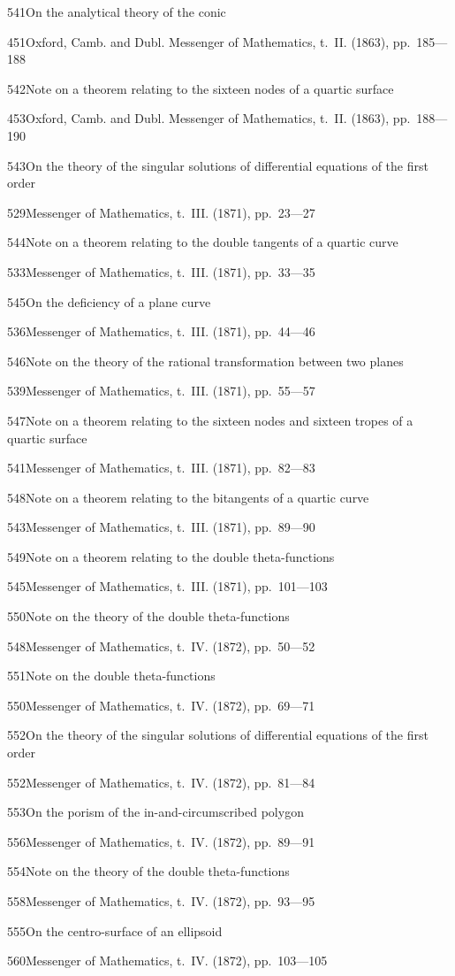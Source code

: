 \documentclass[11pt,a4paper]{book}
\providecommand{\tocentry}[2]{#1\dotfill #2\par}
\begin{document}
\tocentry{541}{On the analytical theory of the conic}{451}{Oxford, Camb. and Dubl. Messenger of Mathematics, t.~II. (1863), pp.~185---188}

\tocentry{542}{Note on a theorem relating to the sixteen nodes of a quartic surface}{453}{Oxford, Camb. and Dubl. Messenger of Mathematics, t.~II. (1863), pp.~188---190}

\newpage

\tocentry{543}{On the theory of the singular solutions of differential equations of the first order}{529}{Messenger of Mathematics, t.~III. (1871), pp.~23---27}

\tocentry{544}{Note on a theorem relating to the double tangents of a quartic curve}{533}{Messenger of Mathematics, t.~III. (1871), pp.~33---35}

\tocentry{545}{On the deficiency of a plane curve}{536}{Messenger of Mathematics, t.~III. (1871), pp.~44---46}

\tocentry{546}{Note on the theory of the rational transformation between two planes}{539}{Messenger of Mathematics, t.~III. (1871), pp.~55---57}

\tocentry{547}{Note on a theorem relating to the sixteen nodes and sixteen tropes of a quartic surface}{541}{Messenger of Mathematics, t.~III. (1871), pp.~82---83}

\tocentry{548}{Note on a theorem relating to the bitangents of a quartic curve}{543}{Messenger of Mathematics, t.~III. (1871), pp.~89---90}

\tocentry{549}{Note on a theorem relating to the double theta-functions}{545}{Messenger of Mathematics, t.~III. (1871), pp.~101---103}

\tocentry{550}{Note on the theory of the double theta-functions}{548}{Messenger of Mathematics, t.~IV. (1872), pp.~50---52}

\tocentry{551}{Note on the double theta-functions}{550}{Messenger of Mathematics, t.~IV. (1872), pp.~69---71}

\tocentry{552}{On the theory of the singular solutions of differential equations of the first order}{552}{Messenger of Mathematics, t.~IV. (1872), pp.~81---84}

\tocentry{553}{On the porism of the in-and-circumscribed polygon}{556}{Messenger of Mathematics, t.~IV. (1872), pp.~89---91}

\tocentry{554}{Note on the theory of the double theta-functions}{558}{Messenger of Mathematics, t.~IV. (1872), pp.~93---95}

\tocentry{555}{On the centro-surface of an ellipsoid}{560}{Messenger of Mathematics, t.~IV. (1872), pp.~103---105}
\end{document}
